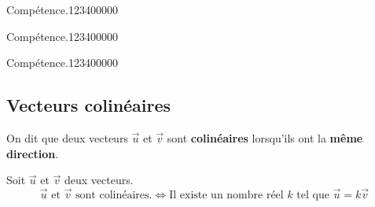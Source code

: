 
\begin{pageAD}  %
\restoregeometry %


\begin{ExoCad}{Compétence.}{1234}{0}{0}{0}{0}{0}

\end{ExoCad}


\begin{ExoCad}{Compétence.}{1234}{0}{0}{0}{0}{0}

\end{ExoCad}


\begin{ExoCad}{Compétence.}{1234}{0}{0}{0}{0}{0}

\end{ExoCad}
 
\end{pageAD} %



\begin{pageCours} %

\section{Vecteurs colinéaires}

\begin{Def}
On dit que deux vecteurs $\vec{u}$ et $\vec{v}$ sont \textbf{colinéaires} lorsqu'ils ont la \textbf{même direction}.
\end{Def}

\begin{Pp}
Soit $\vec{u}$ et $\vec{v}$ deux vecteurs.
\[ \vec{u} \text{ et } \vec{v} \text{ sont colinéaires.}\Leftrightarrow  \text{Il existe un nombre réel } k\text{ tel que }\vec{u}=k\vec{v}\]
\end{Pp}

\end{pageCours} %

